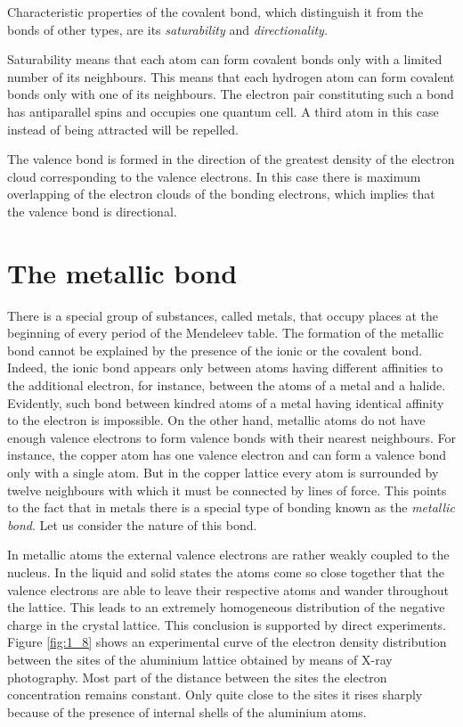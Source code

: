 Characteristic properties of the covalent bond, which distinguish it from the bonds of other types, are its \textit{saturability} and \textit{directionality}.

Saturability means that each atom can form covalent bonds only with a limited number of its neighbours. This means that each hydrogen atom can form covalent bonds only with one of its neighbours. The electron pair constituting such a bond has antiparallel spins and occupies one quantum cell. A third atom in this case instead of being attracted will be repelled.

The valence bond is formed in the direction of the greatest density of the electron cloud corresponding to the valence electrons. In this case there is maximum overlapping of the electron clouds of the bonding electrons, which implies that the valence bond is directional.

\section{The metallic bond}\label{sec:1_4}

There is a special group of substances, called metals, that occupy places at the beginning of every period of the Mendeleev table. The formation of the metallic bond cannot be explained by the presence of the ionic or the covalent bond. Indeed, the ionic bond appears only between atoms having different affinities to the additional electron, for instance, between the atoms of a metal and a halide. Evidently, such bond between kindred atoms of a metal having identical affinity to the electron is impossible. On the other hand, metallic atoms do not have enough valence electrons to form valence bonds with their nearest neighbours. For instance, the copper atom has one valence electron and can form a valence bond only with a single atom. But in the copper lattice every atom is surrounded by twelve neighbours with which it must be connected by lines of force. This points to the fact that in metals there is a special type of bonding known as the \textit{metallic bond}. Let us consider the nature of this bond.

In metallic atoms the external valence electrons are rather weakly coupled to the nucleus. In the liquid and solid states the atoms come so close together that the valence electrons are able to leave their respective atoms and wander throughout the lattice. This leads to an extremely homogeneous distribution of the negative charge in the crystal lattice. This conclusion is supported by direct experiments. Figure \ref{fig:1_8} shows an experimental curve of the electron density distribution between the sites of the aluminium lattice obtained by means of X-ray photography. Most part of the distance between the sites the electron concentration remains constant. Only quite close to the sites it rises sharply because of the presence of internal shells of the aluminium atoms.

